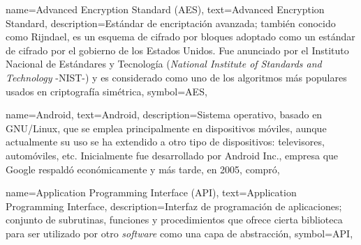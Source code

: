 








{
    name={Advanced Encryption Standard (AES)},
    text={Advanced Encryption Standard},
    description={Estándar de encriptación avanzada; también conocido como Rijndael, es un esquema de cifrado por bloques adoptado como un estándar de cifrado por el gobierno de los Estados Unidos. Fue anunciado por el Instituto Nacional de Estándares y Tecnología (\textit{National Institute of Standards and Technology} -NIST-) y es considerado como uno de los algoritmos más populares usados en criptografía simétrica},
    symbol={AES},
}

{
    name={Android},
    text={Android},
    description={Sistema operativo, basado en GNU/Linux, que se emplea principalmente en dispositivos móviles, aunque actualmente su uso se ha extendido a otro tipo de dispositivos: televisores, automóviles, etc. Inicialmente fue desarrollado por Android Inc., empresa que Google respaldó económicamente y más tarde, en 2005, compró},
}

{
    name={Application Programming Interface (API)},
    text={Application Programming Interface},
    description={Interfaz de programación de aplicaciones; conjunto de subrutinas, funciones y procedimientos que ofrece cierta biblioteca para ser utilizado por otro \textit{software} como una capa de abstracción},
    symbol={API},
}

